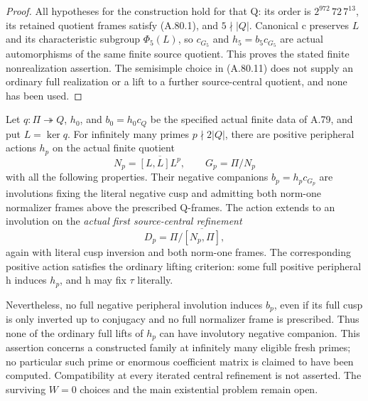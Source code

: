 \begin{proof}
All hypotheses for the construction hold for that Q: its
order is \(2^{972}\,72\,7^{13}\), its retained quotient
frames satisfy (A.80.1), and \(5\nmid|Q|\). Canonical c
preserves \(L\) and its characteristic subgroup
\(\Phi_5(L)\), so \(c_{G_5}\) and \(h_5=b_5c_{G_5}\)
are actual automorphisms of the same finite source quotient.
This proves the stated finite nonrealization assertion.
The semisimple choice in (A.80.11) does not supply an
ordinary full realization or a lift to a further source-central
quotient, and none has been used.
\end{proof}



Let \(q:\Pi\twoheadrightarrow Q\), \(h_0\), and
\(b_0=h_0c_Q\) be the specified actual finite data of A.79,
and put \(L=\ker q\). For infinitely many primes
\(p\nmid2|Q|\), there are positive peripheral actions
\(h_p\) on the actual finite quotient
\[
 N_p=\overline{[L,L]L^p},\qquad G_p=\Pi/N_p
 \tag{A.81.1}
\]
with all the following properties. Their negative companions
\(b_p=h_pc_{G_p}\) are involutions fixing the literal
negative cusp and admitting both norm-one normalizer frames
above the prescribed Q-frames. The action extends to an
involution on the \emph{actual first source-central refinement}
\[
                         D_p=\Pi/\overline{[N_p,\Pi]},
 \tag{A.81.2}
\]
again with literal cusp inversion and both norm-one frames.
The corresponding positive action satisfies the ordinary
lifting criterion: some full positive peripheral h induces
\(h_p\), and h may fix \(\tau\) literally.

Nevertheless, no full negative peripheral involution induces
\(b_p\), even if its full cusp is only inverted up to
conjugacy and no full normalizer frame is prescribed. Thus
none of the ordinary full lifts of \(h_p\) can have
involutory negative companion. This assertion concerns a
constructed family at infinitely many eligible fresh primes;
no particular such prime or enormous coefficient matrix is
claimed to have been computed. Compatibility at every
iterated central refinement is not asserted. The surviving
\(W=0\) choices and the main existential problem remain open.

